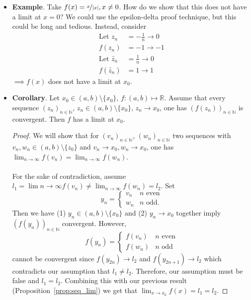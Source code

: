 \documentclass{article}
\newcommand{\R}{\mathbb{R}}
\newcommand{\N}{\mathbb{N}}
\newcommand{\seq}[2]{(#1_{#2})_{#2 \in \N}}
\newcommand{\?}{\stackrel{?}{=}}
\theoremstyle{definition} %
\begin{document}
\begin{itemize}
\begin{proof}
          \end{proof}
    \item \textbf{Example}. \label{example_seq_lim} Take $f(x) = \nicefrac{x}{|x|}, x \neq 0$. How do we show that this does not have a limit at $x = 0$? We could use the epsilon-delta proof technique, but this could be long and tedious. Instead, consider
          \begin{align*}
              \text{Let } z_n             & = -\frac{1}{n} \rightarrow 0 \\
              f(z_n)                      & = -1 \rightarrow -1          \\
              \text{Let } \widetilde{z_n} & = \frac{1}{n} \rightarrow 0  \\
              f(\widetilde{z_n})          & = 1 \rightarrow 1
          \end{align*}
          $\implies f(x)$ does not have a limit at $x_0$.
    \item \textbf{Corollary}. Let $x_0 \in (a, b) \setminus \{x_0\}$, $f: (a, b) \mapsto \R$. Assume that every sequence $\seq{z}{n}$, $z_n \in (a, b) \setminus \{x_0\}$, $z_n \rightarrow x_0$, one has $(f(z_n))_{n \in \N}$ is convergent. Then $f$ has a limit at $x_0$.
          \begin{proof}
              We will show that for $\seq{v}{n}$, $\seq{w}{n}$ two sequences with $v_n, w_n \in (a, b) \setminus \{z_0\}$ and $v_n \rightarrow x_0, w_n \rightarrow x_0$, one has $\lim_{n \to \infty} f(v_n) = \lim_{n \to \infty} f(w_n)$. \\\\
              For the sake of contradiction, assume $l_1 = \lim{n \to \infty} f(v_n) \neq \lim_{n \to \infty} f(w_n) = l_2$. Set
              \[ y_n =
                  \begin{cases}
                      v_n & n \text{ even} \\
                      w_n & n \text{ odd}.
                  \end{cases}
              \]
              Then we have (1) $y_n \in (a, b) \setminus \{x_0\}$ and (2) $y_n \rightarrow x_0$ together imply $(f(y_n))_{n \in \N}$ convergent. However,
              \[
                  f(y_n) =
                  \begin{cases}
                      f(v_n) & n \text{ even} \\
                      f(w_n) & n \text{ odd}
                  \end{cases}
              \]
              cannot be convergent since $f(y_{2n}) \rightarrow l_2$ and $f(y_{2n + 1}) \rightarrow l_2$ which contradicts our assumption that $l_1 \neq l_2$. Therefore, our assumption must be false and $l_1 = l_2$. Combining this with our previous result (Proposition~\ref{prop:seq_lim}) we get that $\lim_{x \to x_0} f(x) = l_1 = l_2$.

\end{proof}
\end{itemize}
\end{document}
